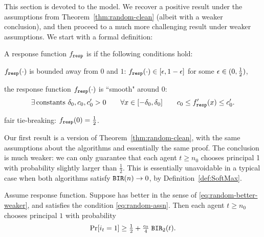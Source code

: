This section is devoted to the \SoftMaxRandom model. We recover a positive result under the assumptions from Theorem~\ref{thm:random-clean} (albeit with a weaker conclusion), and then proceed to a much more challenging result under weaker assumptions. We start with a formal definition:

\begin{definition}\label{def:SoftMax}
A response function $f_{\mathtt{resp}}$ is \SoftMaxRandom if the following conditions hold:
\begin{OneLiners}
\item  $f_{\mathtt{resp}}(\cdot)$ is bounded away from $0$ and $1$:
    $f_{\mathtt{resp}}(\cdot)\in [\epsilon,1-\epsilon]$ for some $\epsilon\in (0,\tfrac12)$,
\item  the response function
 $f_{\mathtt{resp}}(\cdot)$ is ``smooth" around $0$:
 \begin{align}\label{eq:SoftMax-smooth}
 \exists\, \text{constants $\delta_0,c_0,c'_0>0$}
    \qquad \forall x\in [-\delta_0,\delta_0] \qquad
    c_0 \leq f_{\mathtt{resp}}'(x) \leq c'_0.
 \end{align}
\item fair tie-breaking: $f_{\mathtt{resp}}(0)=\tfrac12$.
\end{OneLiners}
\end{definition}

\begin{remark}
\end{remark}

Our first result is a version of Theorem~\ref{thm:random-clean}, with the same assumptions about the algorithms and essentially the same proof. The conclusion is much weaker: we can only guarantee that each agent $t\geq n_0$ chooses principal 1 with probability slightly larger than $\tfrac12$. This is essentially unavoidable in a typical case when both algorithms satisfy $\mathtt{BIR}(n)\to 0$, by Definition~\ref{def:SoftMax}.

\begin{theorem}\label{thm:SoftMax-weak}
  Assume \SoftMaxRandom response function. Suppose \alg[1] has better
  \BIR in the sense of \eqref{eq:random-better-weaker}, and \alg[2]
  satisfies the condition \eqref{eq:random-assn}. Then each agent
  $t\geq n_0$ chooses principal $1$ with probability
\begin{align}\label{eq:thm:SoftMax-weak}
     \Pr[i_t = 1]\geq \tfrac12 +  \tfrac{c_0}{4}\; \mathtt{BIR}_2(t).
\end{align}
\end{theorem}

